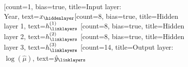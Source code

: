 \documentclass{standalone}
\begin{document}
    \begin{neuralnetwork}[height=17]
        \newcommand{\x}[2]{$x_#2$}
	\newcommand{\Year}[2]{\small$\text{Year}_i$}
	\newcommand{\y}[2]{$\hat{y}_{#2}$}
        \newcommand{\mort}[2]{$\hat{\mu}_#2$}
        \newcommand{\hfirst}[2]{\small $h^{(1)}_#2$}
        \newcommand{\hsecond}[2]{\small $h^{(2)}_#2$}
        \newcommand{\hthird}[2]{\small $h^{(3)}_#2$}
	[count=1, bias=true, title=Input layer:\\Year, text=\x]
        \hiddenlayer[count=8, bias=true, title=Hidden\\layer 1, text=\hfirst] \linklayers
        \hiddenlayer[count=8, bias=true, title=Hidden\\layer 2, text=\hsecond] \linklayers
        \hiddenlayer[count=8, bias=true, title=Hidden\\layer 3, text=\hthird] \linklayers
	\outputlayer[count=14, title=Output layer:\\$\log(\hat{\mu})$, text=\y] \linklayers
    \end{neuralnetwork}
\end{document}
